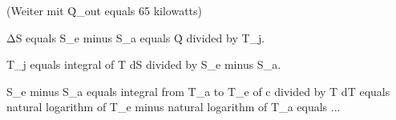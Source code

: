 (Weiter mit Q̇_out equals 65 kilowatts)  

ΔS equals S_e minus S_a equals Q̇ divided by T_j.  

T_j equals integral of T dS divided by S_e minus S_a.  

S_e minus S_a equals integral from T_a to T_e of c divided by T dT equals natural logarithm of T_e minus natural logarithm of T_a equals ...